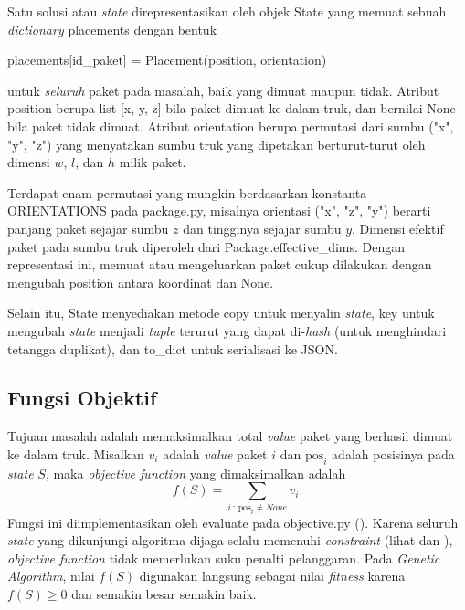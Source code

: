 Satu solusi atau \textit{state} direpresentasikan oleh objek State yang memuat sebuah \textit{dictionary} placements dengan bentuk
\begin{center}
placements[id\_paket] = Placement(position, orientation)
\end{center}
untuk \textit{seluruh} paket pada masalah, baik yang dimuat maupun tidak. Atribut position berupa list [x, y, z] bila paket dimuat ke dalam truk, dan bernilai None bila paket tidak dimuat. Atribut orientation berupa permutasi dari sumbu ("x", "y", "z") yang menyatakan sumbu truk yang dipetakan berturut-turut oleh dimensi $w$, $l$, dan $h$ milik paket. 

Terdapat enam permutasi yang mungkin berdasarkan konstanta ORIENTATIONS pada package.py, misalnya orientasi ("x", "z", "y") berarti panjang paket sejajar sumbu $z$ dan tingginya sejajar sumbu $y$. Dimensi efektif paket pada sumbu truk diperoleh dari Package.effective\_dims. Dengan representasi ini, memuat atau mengeluarkan paket cukup dilakukan dengan mengubah position antara koordinat dan None.

Selain itu, State menyediakan metode copy untuk menyalin \textit{state}, key untuk mengubah \textit{state} menjadi \textit{tuple} terurut yang dapat di-\textit{hash} (untuk menghindari tetangga duplikat), dan to\_dict untuk serialisasi ke JSON.

\subsection{Fungsi Objektif}

Tujuan masalah adalah memaksimalkan total \textit{value} paket yang berhasil dimuat ke dalam truk. Misalkan $v_i$ adalah \textit{value} paket $i$ dan $\text{pos}_i$ adalah posisinya pada \textit{state} $S$, maka \textit{objective function} yang dimaksimalkan adalah
\begin{equation}
f(S) = \sum_{i \,:\, \text{pos}_i \neq None} v_i .
\end{equation}
Fungsi ini diimplementasikan oleh evaluate pada objective.py (). Karena seluruh \textit{state} yang dikunjungi algoritma dijaga selalu memenuhi \textit{constraint} (lihat  dan ), \textit{objective function} tidak memerlukan suku penalti pelanggaran. Pada \textit{Genetic Algorithm}, nilai $f(S)$ digunakan langsung sebagai nilai \textit{fitness} karena $f(S) \geq 0$ dan semakin besar semakin baik.


